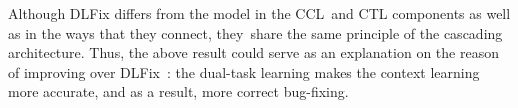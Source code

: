 Although DLFix differs from the  model in the CCL~and
CTL components as well as in the ways that they connect, they~share
the same principle of the cascading architecture. Thus, the above result
could serve as an explanation on the reason of {\tool} improving over
DLFix~\cite{icse20}: the dual-task learning makes the context learning
more accurate, and as a result, more correct bug-fixing.






